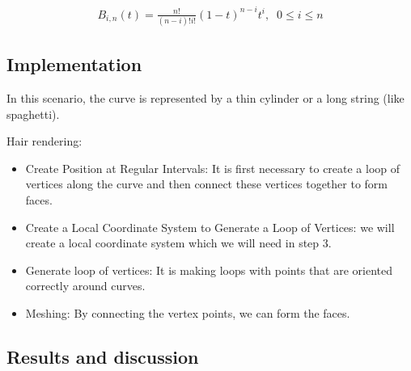 \documentclass{article}
\begin{document}
	
	
	\begin{equation}
		\begin{split}
			B_{i,n}(t) = \frac{n!}{(n - i)!i!}(1-t)^{n-i}t^i , \;\; 0 \leq i \leq n
		\end{split}		
	\end{equation}
	\subsection{Implementation}
	In this scenario, the curve is represented by a thin cylinder or a long string (like spaghetti).
	
	Hair rendering:
	\begin{itemize}
		\item Create Position at Regular Intervals:
		It is first necessary to create a loop of vertices along the curve and then connect these vertices together to form faces.
		\item Create a Local Coordinate System to Generate a Loop of Vertices: we will create a local coordinate system which we will need in step 3.
		
		\item Generate loop of vertices:
		It is making loops with points that are oriented correctly around curves.
		
		\item Meshing: By connecting the vertex points, we can form the faces.
	\end{itemize}	
	
	\subsection{Results and discussion}
	
\end{document}
